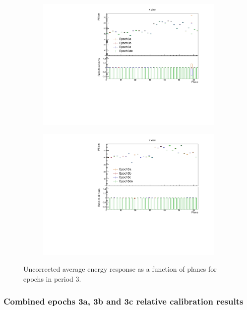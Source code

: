 \documentclass[12pt,a4paper]{article}
\begin{document}
\begin{figure}[!hbtp]
\centering
\begin{subfigure}[b]{0.495\textwidth}
\centering
\includegraphics[width=\textwidth]{Plots/Attenprofs_P3Data_PlanePE_X_Combined.pdf}
\end{subfigure}
\begin{subfigure}[b]{0.495\textwidth}
\centering
\includegraphics[width=\textwidth]{Plots/Attenprofs_P3Data_PlanePE_Y_Combined.pdf}
\end{subfigure}
\caption{Uncorrected average energy response as a function of planes for epochs in period 3.}
\label{figCalibhistPlanePE_period3}
\end{figure}

\subsubsection*{Combined epochs 3a, 3b and 3c relative calibration results}
\end{document}
